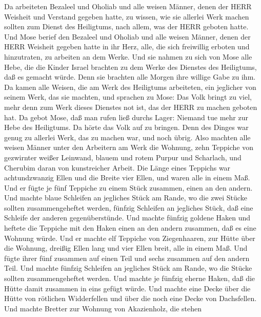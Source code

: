  Da arbeiteten Bezaleel und Oholiab und alle weisen Männer,
denen der HERR Weisheit und Verstand gegeben hatte, zu wissen, wie sie
allerlei Werk machen sollten zum Dienst des Heiligtums, nach allem, was
der HERR geboten hatte.  Und Mose berief den Bezaleel und
Oholiab und alle weisen Männer, denen der HERR Weisheit gegeben hatte in
ihr Herz, alle, die sich freiwillig erboten und hinzutraten, zu arbeiten
an dem Werke.  Und sie nahmen zu sich von Mose alle Hebe,
die die Kinder Israel brachten zu dem Werke des Dienstes des Heiligtums,
daß es gemacht würde. Denn sie brachten alle Morgen ihre willige Gabe zu
ihm.  Da kamen alle Weisen, die am Werk des Heiligtums
arbeiteten, ein jeglicher von seinem Werk, das sie machten, 
und sprachen zu Mose: Das Volk bringt zu viel, mehr denn zum Werk dieses
Dienstes not ist, das der HERR zu machen geboten hat.  Da
gebot Mose, daß man rufen ließ durchs Lager: Niemand tue mehr zur Hebe
des Heiligtums. Da hörte das Volk auf zu bringen.  Denn des
Dinges war genug zu allerlei Werk, das zu machen war, und noch übrig.
 Also machten alle weisen Männer unter den Arbeitern am Werk
die Wohnung, zehn Teppiche von gezwirnter weißer Leinwand, blauem und
rotem Purpur und Scharlach, und Cherubim daran von kunstreicher Arbeit.
 Die Länge eines Teppichs war achtundzwanzig Ellen und die
Breite vier Ellen, und waren alle in einem Maß.  Und er
fügte je fünf Teppiche zu einem Stück zusammen, einen an den andern.
 Und machte blaue Schleifen an jegliches Stück am Rande, wo
die zwei Stücke sollten zusammengeheftet werden,  fünfzig
Schleifen an jegliches Stück, daß eine Schleife der anderen
gegenüberstünde.  Und machte fünfzig goldene Haken und
heftete die Teppiche mit den Haken einen an den andern zusammen, daß es
eine Wohnung würde.  Und er machte elf Teppiche von
Ziegenhaaren, zur Hütte über die Wohnung,  dreißig Ellen
lang und vier Ellen breit, alle in einem Maß.  Und fügte
ihrer fünf zusammen auf einen Teil und sechs zusammen auf den andern
Teil.  Und machte fünfzig Schleifen an jegliches Stück am
Rande, wo die Stücke sollten zusammengeheftet werden.  Und
machte je fünfzig eherne Haken, daß die Hütte damit zusammen in eins
gefügt würde.  Und machte eine Decke über die Hütte von
rötlichen Widderfellen und über die noch eine Decke von Dachsfellen.
 Und machte Bretter zur Wohnung von Akazienholz, die stehen
